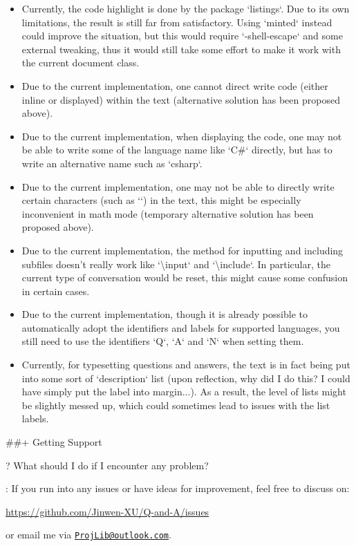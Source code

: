 \documentclass[%
  use style = classical,
  scroll,
]{Q-and-A}
\begin{document}
  \begin{itemize}
    \item Currently, the code highlight is done by the package `listings`. Due to its own limitations, the result is still far from satisfactory. Using `minted` instead could improve the situation, but this would require `-shell-escape` and some external tweaking, thus it would still take some effort to make it work with the current document class.
    \item Due to the current implementation, one cannot direct write code (either inline or displayed) within the text (alternative solution has been proposed above).
    \item Due to the current implementation, when displaying the code, one may not be able to write some of the language name like `C\#` directly, but has to write an alternative name such as `csharp`.
    \item Due to the current implementation, one may not be able to directly write certain characters (such as `\textasterisk`) in the text, this might be especially inconvenient in math mode (temporary alternative solution has been proposed above).
    \item Due to the current implementation, the method for inputting and including subfiles doesn't really work like `\textbackslash input` and `\textbackslash include`. In particular, the current type of conversation would be reset, this might cause some confusion in certain cases.
    \item Due to the current implementation, though it is already possible to automatically adopt the identifiers and labels for supported languages, you still need to use the identifiers `Q`, `A` and `N` when setting them.
    \item Currently, for typesetting questions and answers, the text is in fact being put into some sort of `description` list (upon reflection, why did I do this? I could have simply put the label into margin...). As a result, the level of lists might be slightly messed up, which could sometimes lead to issues with the list labels.
  \end{itemize}


##+ {Getting Support}

?
  What should I do if I encounter any problem?

:
  If you run into any issues or have ideas for improvement, feel free to discuss on:
  \begin{center}
      \url{https://github.com/Jinwen-XU/Q-and-A/issues}
  \end{center}
  or email me via \href{mailto:ProjLib@outlook.com}{\texttt{ProjLib@outlook.com}}.


\vspace{3\baselineskip}



\end{document}
